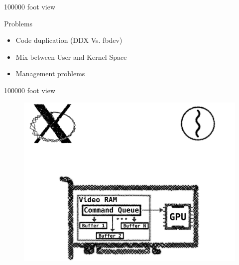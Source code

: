 \documentclass[10pt, compress, aspectratio=169]{beamer}
\begin{document}
\begin{frame}{100000 foot view}
  \begin{exampleblock}{Problems}
    \begin{itemize}
      \item Code duplication (DDX Vs. fbdev) \pause
      \item Mix between User and Kernel Space \pause
      \item Management problems \pause
    \end{itemize}
  \end{exampleblock}
\end{frame}

\begin{frame}{100000 foot view}
  \begin{figure}
    \centering
    \includegraphics[width=\linewidth,
                     height=0.8\textheight,
                     keepaspectratio]{with_drm_1}
  \end{figure}
\end{frame}
\end{document}
